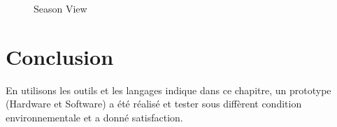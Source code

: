 \begin{figure}[hbt]
\centering
\right
\label{fig:Season View}

  \caption{Season View}
\end{figure}
\newpage
\section{Conclusion}

En utilisons les outils et les langages indique dans ce chapitre, un prototype (Hardware et Software)  a été réalisé et tester sous diffèrent condition environnementale et a donné satisfaction. 
